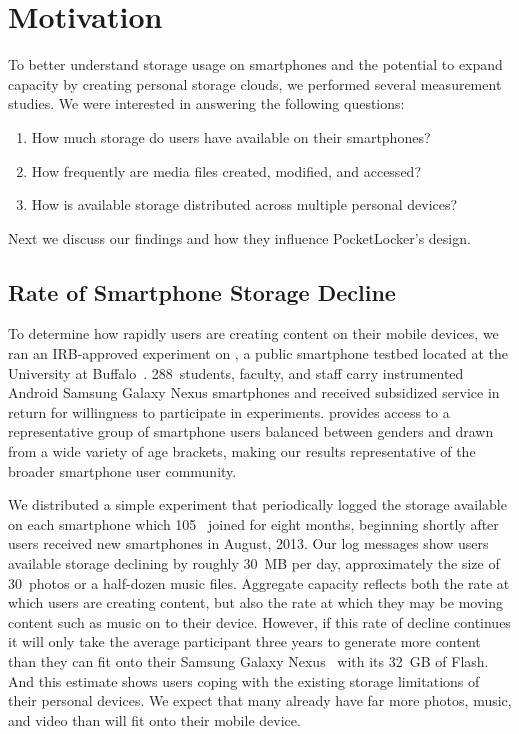 
\section{Motivation}
\label{sec-motivation}

To better understand storage usage on smartphones and the potential to expand
capacity by creating personal storage clouds, we performed several
measurement studies. We were interested in answering the following questions:

\begin{enumerate}

\item How much storage do users have available on their smartphones?

\item How frequently are media files created, modified, and accessed?

\item How is available storage distributed across multiple personal devices?

\end{enumerate}

Next we discuss our findings and how they influence PocketLocker's design.

\subsection{Rate of Smartphone Storage Decline}

To determine how rapidly users are creating content on their mobile devices,
we ran an IRB-approved experiment on \PhoneLab{}, a public smartphone testbed
located at the University at Buffalo~\cite{nandugudi2013phonelab}.
288~students, faculty, and staff carry instrumented Android Samsung Galaxy
Nexus smartphones and received subsidized service in return for willingness
to participate in experiments. \PhoneLab{} provides access to a
representative group of smartphone users balanced between genders and drawn
from a wide variety of age brackets, making our results representative of the
broader smartphone user community.

We distributed a simple experiment that periodically logged the storage
available on each smartphone which 105~\PhoneLab{} joined for eight months,
beginning shortly after \PhoneLab{} users received new smartphones in August,
2013. Our log messages show users available storage declining by roughly
30~MB per day, approximately the size of 30~photos or a half-dozen music
files. Aggregate capacity reflects both the rate at which users are creating
content, but also the rate at which they may be moving content such as music
on to their device. However, if this rate of decline continues it will only
take the average \PhoneLab{} participant three years to generate more content
than they can fit onto their Samsung Galaxy Nexus~\cite{galaxynexus} with its
32~GB of Flash. And this estimate shows users coping with the existing
storage limitations of their personal devices. We expect that many already
have far more photos, music, and video than will fit onto their mobile
device.

